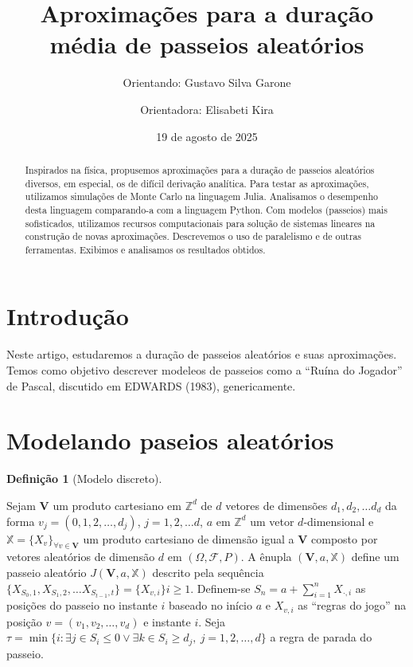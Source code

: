 \documentclass[
  brazilian,
  12pt,
]{article}
\title{Aproximações para a duração média de passeios aleatórios}
\author{Orientando: Gustavo Silva Garone \and Orientadora: Elisabeti
Kira}
\date{19 de agosto de 2025}
\theoremstyle{definition}
\newtheorem{definition}{Definição}[section]
\theoremstyle{definition}
\theoremstyle{remark}
\begin{document}
\maketitle
\begin{abstract}
Inspirados na física, propusemos aproximações para a duração de passeios
aleatórios diversos, em especial, os de difícil derivação analítica.
Para testar as aproximações, utilizamos simulações de Monte Carlo na
linguagem Julia. Analisamos o desempenho desta linguagem comparando-a
com a linguagem Python. Com modelos (passeios) mais sofisticados,
utilizamos recursos computacionais para solução de sistemas lineares na
construção de novas aproximações. Descrevemos o uso de paralelismo e de
outras ferramentas. Exibimos e analisamos os resultados obtidos.
\end{abstract}


\section{Introdução}\label{introduuxe7uxe3o}

Neste artigo, estudaremos a duração de passeios aleatórios e suas
aproximações. Temos como objetivo descrever modeleos de passeios como a
``Ruína do Jogador'' de Pascal, discutido em EDWARDS (1983),
genericamente.

\section{Modelando paseios
aleatórios}\label{modelando-paseios-aleatuxf3rios}

\begin{definition}[Modelo
discreto]\protect\hypertarget{def-modelodiscreto}{}\label{def-modelodiscreto}

Sejam \(\pmb{V}\) um produto cartesiano em \(\mathbb{Z}^d\) de \(d\)
vetores de dimensões \(d_1, d_2, \dots d_d\) da forma
\(v_j =(0, 1, 2, \dots, d_j)\), \(j =
1,2,\ldots d\), \(a\) em \(\mathbb{Z}^d\) um vetor \(d\)-dimensional e
\(\mathbb{X} =
\{X_{v}\}_{\forall v \in \pmb{V}}\) um produto cartesiano de dimensão
igual a \(\pmb{V}\) composto por vetores aleatórios de dimensão \(d\) em
\((\Omega,
\mathscr{F}, P)\). A ênupla \((\pmb{V}, a, \mathbb{X})\) define um
passeio aleatório \(J(\pmb{V},a, \mathbb{X})\) descrito pela sequência
\(\{X_{S_0, 1},
X_{S_1, 2}, \dots X_{S_{t-1}, t}\} = \{X_{v, i}\}{i\geq1}\). Definem-se
\(S_n = a
+\sum^n_{i=1} X_{\cdot, i}\) as posições do passeio no instante \(i\)
baseado no início \(a\) e \(X_{v, i}\) as ``regras do jogo'' na posição
\(v = (v_1, v_2, \dots,
v_d)\) e instante \(i\). Seja
\(\tau = \min\{i : \exists j \in S_i \leq 0 \lor
\exists k \in S_i \geq d_j,\ j = 1, 2, \dots, d\}\) a regra de parada do
passeio.

\end{definition}
\end{document}
